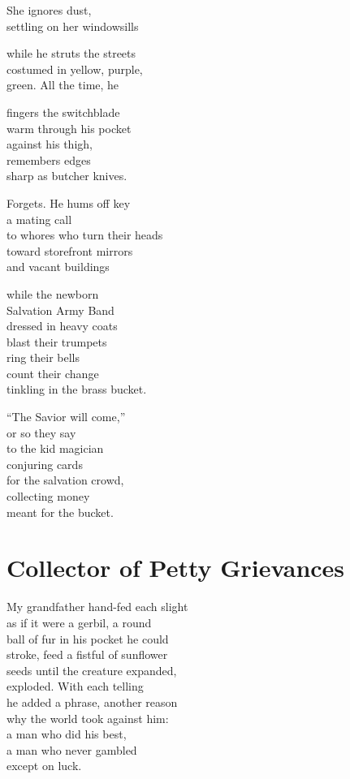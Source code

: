 \documentclass[twoside,10pt]{book}
\begin{document}
She ignores dust,\\
settling on her windowsills

while he struts the streets\\
costumed in yellow, purple,\\
green. All the time, he

fingers the switchblade\\
warm through his pocket\\
against his thigh,\\
remembers edges\\
sharp as butcher knives.

Forgets. He hums off key\\
a mating call\\
to whores who turn their heads\\
toward storefront mirrors\\
and vacant buildings

while the newborn\\
Salvation Army Band\\
dressed in heavy coats\\
blast their trumpets\\
ring their bells\\
count their change\\
tinkling in the brass bucket.

``The Savior will come,''\\
or so they say\\
to the kid magician\\
conjuring cards\\
for the salvation crowd,\\
collecting money\\
meant for the bucket.


\clearpage
\section{Collector of Petty Grievances}

My grandfather hand-fed each slight\\
as if it were a gerbil, a round\\
ball of fur in his pocket he could\\
stroke, feed a fistful of sunflower\\
seeds until the creature expanded,\\
exploded. With each telling\\
he added a phrase, another reason\\
why the world took against him:\\
a man who did his best,\\
a man who never gambled\\
except on luck.
\end{document}
